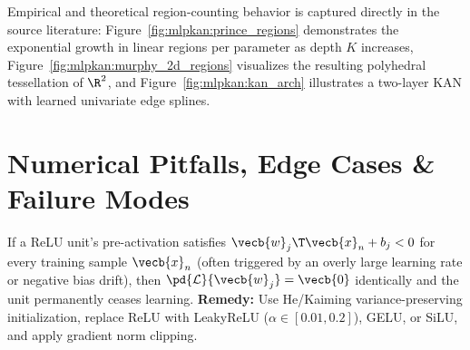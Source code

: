 \documentclass[../../../../master.tex]{subfiles}
\begin{document}
Empirical and theoretical region-counting behavior is captured directly in the source literature: Figure~\ref{fig:mlpkan:prince_regions} demonstrates the exponential growth in linear regions per parameter as depth $K$ increases, Figure~\ref{fig:mlpkan:murphy_2d_regions} visualizes the resulting polyhedral tessellation of $\R^2$, and Figure~\ref{fig:mlpkan:kan_arch} illustrates a two-layer KAN with learned univariate edge splines.




\section{Numerical Pitfalls, Edge Cases \& Failure Modes}
\label{sec:mlpkan:pitfalls}

\begin{pitfall}
If a ReLU unit's pre-activation satisfies $\vecb{w}_j\T \vecb{x}_n + b_j < 0$ for every training sample $\vecb{x}_n$ (often triggered by an overly large learning rate or negative bias drift), then $\pd{\mathcal{L}}{\vecb{w}_j} = \vecb{0}$ identically and the unit permanently ceases learning.
\textbf{Remedy:} Use He/Kaiming variance-preserving initialization, replace ReLU with LeakyReLU ($\alpha \in [0.01, 0.2]$), GELU, or SiLU, and apply gradient norm clipping.
\end{pitfall}
\end{document}
